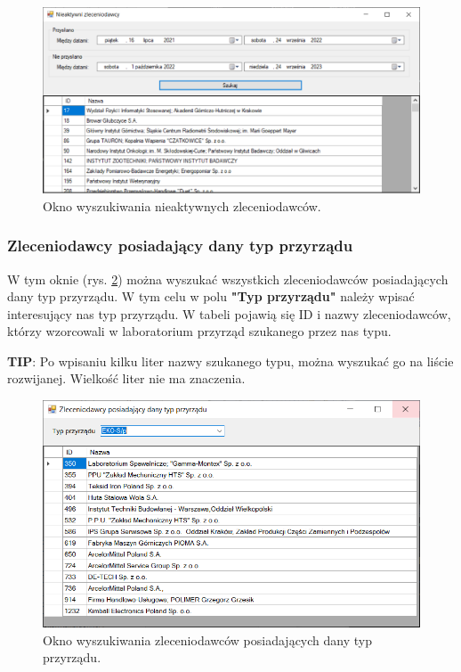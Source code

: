 \begin{figure}[htb]
	\centering
	\includegraphics[width=\columnwidth]{obrazki/Wyszukiwanie/Zleceniodawcy/nieaktywni_zleceniodawcy.png}
	\caption{Okno wyszukiwania nieaktywnych zleceniodawców.}
	\label{nieaktywniZleceniodawcy}
\end{figure}

\subsubsection{Zleceniodawcy posiadający dany typ przyrządu}
\label{wysz_po_przyrzadzie}

W tym oknie (rys. \ref{wyszPoPrzyrzadzie}) można wyszukać wszystkich zleceniodawców posiadających dany typ przyrządu. W tym celu w polu \textbf{"Typ przyrządu"} należy wpisać interesujący nas typ przyrządu. W tabeli pojawią się ID i nazwy zleceniodawców, którzy wzorcowali w laboratorium przyrząd szukanego przez nas typu. 

\textbf{TIP}: Po wpisaniu kilku liter nazwy szukanego typu, można wyszukać go na liście rozwijanej. Wielkość liter nie ma znaczenia.

\begin{figure}[htb]
	\centering
	\includegraphics{obrazki/Wyszukiwanie/Zleceniodawcy/wyszukiwanie_po_przyrzadzie.png}
	\caption{Okno wyszukiwania zleceniodawców posiadających dany typ przyrządu.}
	\label{wyszPoPrzyrzadzie}
\end{figure}


